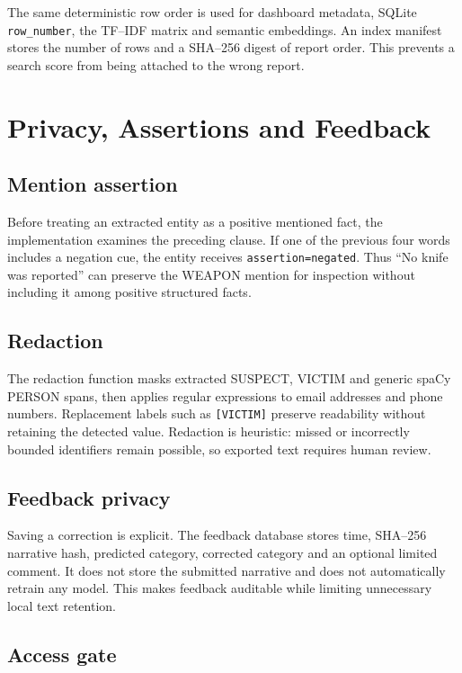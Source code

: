 \documentclass[12pt,a4paper]{report}
\newcommand{\code}[1]{\texttt{#1}}
\begin{document}
The same deterministic row order is used for dashboard metadata, SQLite \code{row\_number}, the TF--IDF matrix and semantic embeddings. An index manifest stores the number of rows and a SHA--256 digest of report order. This prevents a search score from being attached to the wrong report.

\chapter{Privacy, Assertions and Feedback}

\section{Mention assertion}

Before treating an extracted entity as a positive mentioned fact, the implementation examines the preceding clause. If one of the previous four words includes a negation cue, the entity receives \code{assertion=negated}. Thus ``No knife was reported'' can preserve the WEAPON mention for inspection without including it among positive structured facts.

\section{Redaction}

The redaction function masks extracted SUSPECT, VICTIM and generic spaCy PERSON spans, then applies regular expressions to email addresses and phone numbers. Replacement labels such as \code{[VICTIM]} preserve readability without retaining the detected value. Redaction is heuristic: missed or incorrectly bounded identifiers remain possible, so exported text requires human review.

\section{Feedback privacy}

Saving a correction is explicit. The feedback database stores time, SHA--256 narrative hash, predicted category, corrected category and an optional limited comment. It does not store the submitted narrative and does not automatically retrain any model. This makes feedback auditable while limiting unnecessary local text retention.

\section{Access gate}
\end{document}
